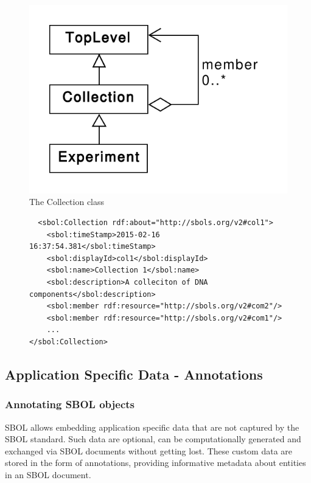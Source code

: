 \documentclass[draftspec]{sbmlpkgspec}
\newcommand{\lstsetsbol}{
 \lstset{language=sbol,
        tabsize=2
 }
}
\begin{document}
\begin{figure}[ht]
\begin{center}
\includegraphics[scale=0.6]{uml/collection}
\caption[]{The Collection class}
\label{uml:collection}
\end{center}
\end{figure}

\begin{figure} [ht]
\lstsetsbol
\begin{lstlisting}
  <sbol:Collection rdf:about="http://sbols.org/v2#col1">
    <sbol:timeStamp>2015-02-16 16:37:54.381</sbol:timeStamp>
    <sbol:displayId>col1</sbol:displayId>
    <sbol:name>Collection 1</sbol:name>
    <sbol:description>A colleciton of DNA components</sbol:description>
    <sbol:member rdf:resource="http://sbols.org/v2#com2"/>
    <sbol:member rdf:resource="http://sbols.org/v2#com1"/>
    ...
</sbol:Collection>
\end{lstlisting}
\label{ser:Collection}
\end{figure}




\subsection{Application Specific Data - Annotations}
\label{sec:annotations}


\subsubsection{Annotating SBOL objects}
SBOL allows embedding application specific data that are not captured by the SBOL standard. Such data are optional, can be computationally generated and exchanged via SBOL documents without getting lost. These custom data are stored in the form of annotations, providing informative metadata about entities in an SBOL document.
\end{document}

